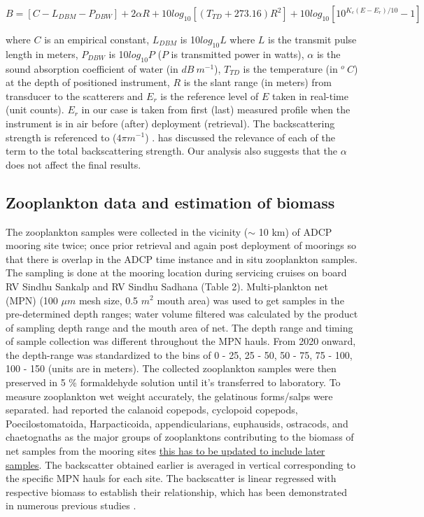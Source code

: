 \documentclass{article}
\begin{document}
	$B = [C - L_{DBM}-P_{DBW}] + 2\alpha R + {10 log_{10}[(T_{TD}+273.16)R^2] } + {10log_{10} [10^{K_c(E-E_r)/10}-1]}$
	
	where $C$ is an empirical constant, $L_{DBM}$ is 10$log_{10}L$ where $L$ is the transmit pulse length in meters, $P_{DBW}$ is 10$log_{10}P$ ($P$ is  transmitted power in watts), $\alpha$ is the sound absorption coefficient of water (in $dB\ m^{-1}$),  $T_{TD}$ is the temperature (in $^o\ C$) at the depth of positioned instrument, $R$  is the slant range (in meters) from transducer to the scatterers and $E_r$ is	the reference level of $E$ taken in real-time (unit counts). $E_r$ in our case is taken from first (last) measured profile when the instrument is in air before (after) deployment (retrieval). The backscattering strength is referenced to ($4\pi m^{-1}$) \citep{deines1999backscatter, mullison2017backscatter}.  \citet{aparna2022seasonal} has discussed the relevance of each of the term to the total backscattering strength. Our analysis also suggests that the $\alpha$ does not affect the final results. 
	
	\subsection{Zooplankton data and estimation of biomass}
	The  zooplankton  samples were collected in the vicinity ($\sim$ 10 km) of ADCP mooring site twice; once prior retrieval and again post deployment of moorings so that there is overlap in the ADCP time instance and in situ zooplankton samples. The sampling is done at the mooring location during servicing cruises on board RV Sindhu Sankalp and RV Sindhu Sadhana (Table 2). Multi-plankton net (MPN) (100 $\mu m$ mesh size, 0.5 $m^2$ mouth area) was used to get samples in the pre-determined depth ranges; water volume filtered was calculated by the product of sampling depth range and the mouth area of net. The depth range and timing of sample collection was different throughout the MPN hauls. From 2020 onward, the depth-range was standardized to the bins of 0 - 25, 25 - 50, 50 - 75, 75 - 100, 100 - 150 (units are in meters). The collected zooplankton samples were then preserved in 5 \% formaldehyde solution until it's transferred to laboratory. To measure zooplankton wet weight accurately, the gelatinous forms/salps were separated. \citep{aparna2022seasonal} had reported the calanoid copepods, cyclopoid copepods, Poecilostomatoida, Harpacticoida, appendicularians, euphausids, ostracods, and
	chaetognaths as the major groups of zooplanktons contributing to the biomass of net samples from the mooring sites {\underline{this has to be updated to include later samples}}. 
	The backscatter obtained earlier is averaged in vertical corresponding to the specific MPN hauls for each site. The backscatter is linear regressed with respective biomass to establish their relationship, which has been demonstrated in numerous previous studies \citep{flagg1989use,heywood1991estimation,jiang2007temporal,aparna2022seasonal}. 
	
\end{document}
